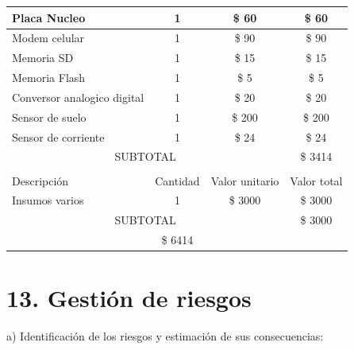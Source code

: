 \documentclass[
11pt, %
]{charter}
\begin{document}
\begin{table}[htpb]
\begin{tabularx}{\linewidth}{@{}|X|c|r|r|@{}}
Placa Nucleo &
  \multicolumn{1}{c|}{1} &
  \multicolumn{1}{c|}{\$ 60} &
  \multicolumn{1}{c|}{\$ 60} \\ \hline
Modem celular &
  \multicolumn{1}{c|}{1} &
  \multicolumn{1}{c|}{\$ 90} &
  \multicolumn{1}{c|}{\$ 90} \\ \hline
Memoria SD &
  \multicolumn{1}{c|}{1} &
  \multicolumn{1}{c|}{\$ 15} &
  \multicolumn{1}{c|}{\$ 15} \\ \hline
Memoria Flash &
  \multicolumn{1}{c|}{1} &
  \multicolumn{1}{c|}{\$ 5} &
  \multicolumn{1}{c|}{\$ 5} \\ \hline
Conversor analogico digital &
  \multicolumn{1}{c|}{1} &
  \multicolumn{1}{c|}{\$ 20} &
  \multicolumn{1}{c|}{\$ 20} \\ \hline
Sensor de suelo &
  \multicolumn{1}{c|}{1} &
  \multicolumn{1}{c|}{\$ 200} &
  \multicolumn{1}{c|}{\$ 200} \\ \hline
Sensor de corriente &
  \multicolumn{1}{c|}{1} &
  \multicolumn{1}{c|}{\$ 24} &
  \multicolumn{1}{c|}{\$ 24} \\ \hline
\multicolumn{3}{|c|}{SUBTOTAL} & 
  \multicolumn{1}{c|}{\$ 3414} \\ \hline
\rowcolor[HTML]{C0C0C0} 
\multicolumn{4}{|c|}{\cellcolor[HTML]{C0C0C0}COSTOS INDIRECTOS} \\ \hline
\rowcolor[HTML]{C0C0C0} 
Descripción &
  \multicolumn{1}{c|}{\cellcolor[HTML]{C0C0C0}Cantidad} &
  \multicolumn{1}{c|}{\cellcolor[HTML]{C0C0C0}Valor unitario} &
  \multicolumn{1}{c|}{\cellcolor[HTML]{C0C0C0}Valor total} \\ \hline
\multicolumn{1}{|l|}{ Insumos varios} &
  \multicolumn{1}{c|}{1} &
  \multicolumn{1}{c|}{\$ 3000} &
  \multicolumn{1}{c|}{\$ 3000} \\ \hline
\multicolumn{3}{|c|}{SUBTOTAL} &
  \multicolumn{1}{c|}{\$ 3000} \\ \hline
\rowcolor[HTML]{C0C0C0}
\multicolumn{3}{|c|}{TOTAL} & \$ 6414
   \\ \hline
\end{tabularx}%
\end{table}


\section{13. Gestión de riesgos}
\label{sec:riesgos}


a) Identificación de los riesgos y estimación de sus consecuencias:
 
\end{document}
